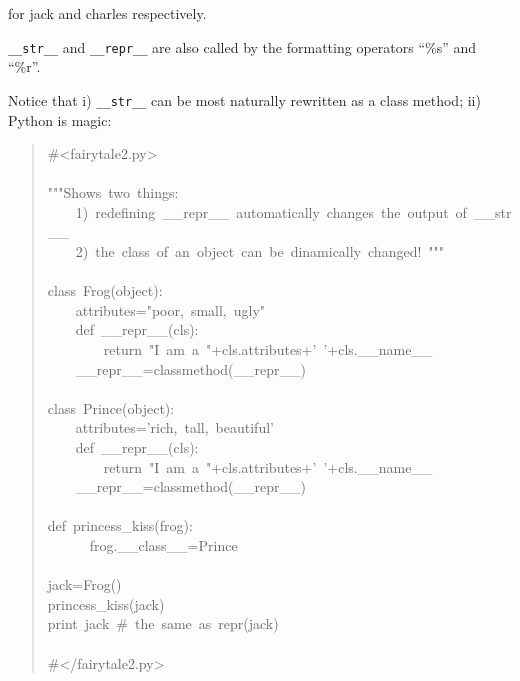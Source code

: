 \documentclass[10pt,english]{article}
\begin{document}
for jack and charles respectively.

\texttt{{\_}{\_}str{\_}{\_}}  and \texttt{{\_}{\_}repr{\_}{\_}} are also called by the formatting
operators ``{\%}s'' and ``{\%}r''.

Notice that  i) \texttt{{\_}{\_}str{\_}{\_}} can be most naturally
rewritten as a class method; ii) Python is magic:
\begin{quote}
\begin{ttfamily}\begin{flushleft}
\mbox{{\#}<fairytale2.py>}\\
\mbox{~~}\\
\mbox{"""Shows~two~things:~}\\
\mbox{~~~~1)~redefining~{\_}{\_}repr{\_}{\_}~automatically~changes~the~output~of~{\_}{\_}str{\_}{\_}}\\
\mbox{~~~~2)~the~class~of~an~object~can~be~dinamically~changed!~"""}\\
\mbox{}\\
\mbox{class~Frog(object):}\\
\mbox{~~~~attributes="poor,~small,~ugly"}\\
\mbox{~~~~def~{\_}{\_}repr{\_}{\_}(cls):}\\
\mbox{~~~~~~~~return~"I~am~a~"+cls.attributes+'~'+cls.{\_}{\_}name{\_}{\_}}\\
\mbox{~~~~{\_}{\_}repr{\_}{\_}=classmethod({\_}{\_}repr{\_}{\_})}\\
\mbox{}\\
\mbox{class~Prince(object):}\\
\mbox{~~~~attributes='rich,~tall,~beautiful'}\\
\mbox{~~~~def~{\_}{\_}repr{\_}{\_}(cls):}\\
\mbox{~~~~~~~~return~"I~am~a~"+cls.attributes+'~'+cls.{\_}{\_}name{\_}{\_}}\\
\mbox{~~~~{\_}{\_}repr{\_}{\_}=classmethod({\_}{\_}repr{\_}{\_})}\\
\mbox{}\\
\mbox{def~princess{\_}kiss(frog):}\\
\mbox{~~~~~~frog.{\_}{\_}class{\_}{\_}=Prince}\\
\mbox{}\\
\mbox{jack=Frog()}\\
\mbox{princess{\_}kiss(jack)}\\
\mbox{print~jack~{\#}~the~same~as~repr(jack)}\\
\mbox{}\\
\mbox{{\#}</fairytale2.py>}
\end{flushleft}\end{ttfamily}
\end{quote}
\end{document}
